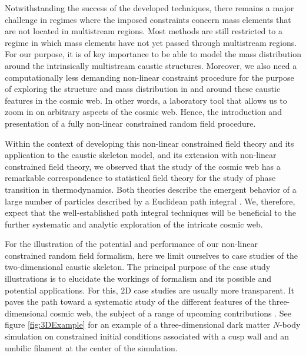 \documentclass[a4paper, 11pt]{article}
\begin{document}
\bigskip
Notwithstanding the success of the developed techniques, there remains a major challenge in regimes where the imposed constraints concern mass elements that are not located in multistream regions. Most methods are still restricted to a regime in which mass elements have not yet passed through multistream regions. For our purpose, it is of key importance to be able to model the mass distribution around the intrinsically multistream caustic structures. Moreover, we also need a computationally less demanding non-linear constraint procedure for the purpose of exploring the structure and mass distribution in and around these caustic features in the cosmic web. In other words, a laboratory tool that allows us to zoom in on arbitrary aspects of the cosmic web. Hence, the introduction and presentation of a fully non-linear constrained random field procedure. 

Within the context of developing this non-linear constrained field theory and its application to the caustic skeleton model, and its extension with non-linear constrained field theory, we observed that the study of the cosmic web has a remarkable correspondence to statistical field theory for the study of phase transition in thermodynamics. Both theories describe the emergent behavior of a large number of particles described by a Euclidean path integral \cite{Feynman:1965}. We, therefore, expect that the well-established path integral techniques will be beneficial to the further systematic and analytic exploration of the intricate cosmic web.

\bigskip
For the illustration of the potential and performance of our non-linear constrained random field formalism, here we limit ourselves to case studies of the two-dimensional caustic skeleton. The principal purpose of the case study illustrations is to elucidate the workings of formalism and its possible and potential applications. For this, $2$D case studies are usually more transparent. It paves the path toward a systematic study of the different features of the three-dimensional cosmic web, the subject of a range of upcoming contributions \cite{Feldbrugge:2022}. See figure \ref{fig:3DExample} for an example of a three-dimensional dark matter $N$-body simulation on constrained initial conditions associated with a cusp wall and an umbilic filament at the center of the simulation.
\end{document}
